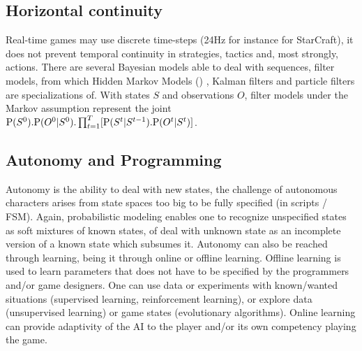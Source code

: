 \subsection{Horizontal continuity}
Real-time games may use discrete time-steps (24Hz for instance for StarCraft), it does not prevent temporal continuity in strategies, tactics and, most strongly, actions. There are several Bayesian models able to deal with sequences, filter models, from which Hidden Markov Models () \citep{Rabiner}, Kalman filters \citep{Kalman1960} and particle filters \citep{particleFiltering} are specializations of. With states $S$ and observations $O$, filter models under the Markov assumption represent the joint $\mathrm{P}(S^0).\mathrm{P}(O^0|S^0).\prod_{t=1}^T[\mathrm{P}(S^t | S^{t-1}).\mathrm{P}(O^t|S^t)]$.

\subsection{Autonomy and Programming}
Autonomy is the ability to deal with new states, the challenge of autonomous characters arises from state spaces too big to be fully specified (in scripts / FSM). Again, probabilistic modeling enables one to recognize unspecified states as soft mixtures of known states, of deal with unknown state as an incomplete version of a known state which subsumes it. Autonomy can also be reached through learning, being it through online or offline learning. Offline learning is used to learn parameters that does not have to be specified by the programmers and/or game designers. One can use data or experiments with known/wanted situations (supervised learning, reinforcement learning), or explore data (unsupervised learning) or game states (evolutionary algorithms). Online learning can provide adaptivity of the AI to the player and/or its own competency playing the game.


